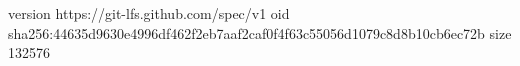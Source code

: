 version https://git-lfs.github.com/spec/v1
oid sha256:44635d9630e4996df462f2eb7aaf2caf0f4f63c55056d1079c8d8b10cb6ec72b
size 132576
